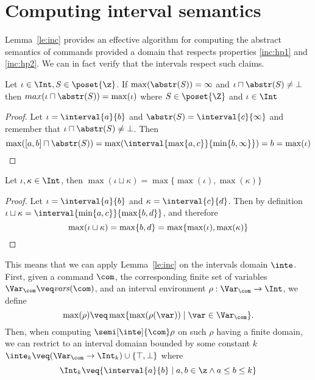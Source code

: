 \section{Computing interval semantics}
\label{sec:computingint}

Lemma~\ref{le:inc} provides an effective algorithm for computing the
abstract semantics of commands provided a domain that respects
properties \ref{inc:hp1} and \ref{inc:hp2}. We can in fact verify that
the intervals respect such claims.

\begin{observation}
  Let \(\iota \in \Int, S \in \poset{\z}\). If
  \(\max(\abstr(S)) = \infty\) and
  \({\iota \sqcap \abstr(S) \neq \bot}\) then
  \({max(\iota \sqcap \abstr(S)) = \max(\iota)}\) where
  \(S \in \poset{\Z}\) and \(\iota \in \Int\)
\end{observation}

\begin{proof}
  Let \(\iota = \interval{a}{b}\) and
  \(\abstr(S) = \interval{c}{\infty}\) and remember that
  \({\iota \sqcap \abstr(S) \neq \bot}\). Then
  \begin{equation*}
    \max([a,b] \sqcap \abstr(S)) = \max(\interval{\max\{a, c\}}{\min\{b , \infty\}}) = b = \max(\iota) \qedhere
  \end{equation*}
\end{proof}

\begin{observation}
  Let \(\iota, \kappa \in \Int\), then
  \(\max(\iota \sqcup \kappa) = \max\{\max(\iota), \max(\kappa)\}\)
\end{observation}

\begin{proof}
  Let \(\iota = \interval{a}{b}\) and \(\kappa =
  \interval{c}{d}\). Then by definition
  \(\iota \sqcup \kappa = \interval{\min\{a,c\}}{\max\{b,d\}}\), and
  therefore
  \begin{equation*}
    \max(\iota \sqcup \kappa) = \max\{b,d\} = \max\{\max(\iota), \max(\kappa)\} \qedhere
  \end{equation*}
\end{proof}

This means that we can apply Lemma~\ref{le:inc} on the intervals
domain \(\inte\).  First, given a command \(\com\), the corresponding
finite set of variables \(\Var_{\com} \veq \mathit{vars}(\com)\), and
an interval environment \(\rho : \Var_{\com} \to \Int\), we define
\[\max(\rho) \veq \max \{ \max(\rho(\var)) \mid \var \in \Var_{\com}
  \}.\]
%
Then, when computing \(\semi[\inte]{\com} \rho\) on such \(\rho\)
having a finite domain, we can restrict to an interval domaian bounded
by some constant \(k\)
\(\inte_k \veq (\Var_{\com} \to \Int_k) \cup \{\top, \bot\}\) where
\begin{equation*}
  \Int_k \veq \{ \interval{a}{b} \mid a, b \in \z \land
  a \leq b \leq k\}
\end{equation*}

